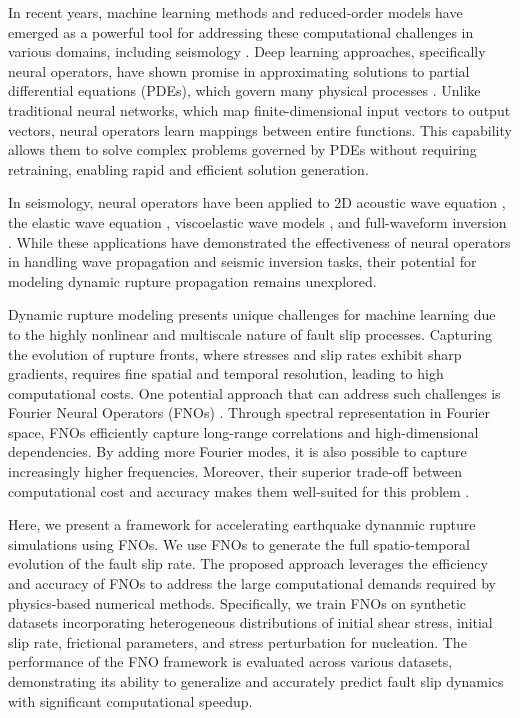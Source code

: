 \documentclass[draft]{agujournal2019}
\begin{document}
In recent years, machine learning methods and reduced-order models have emerged as a powerful tool for addressing these computational challenges in various domains, including seismology \cite{zhu2019seismic, yang2022toward, zhu2019phasenet, mousavi2020earthquake, ross2018p, ross2019phaselink, zhu2022end, rekoske2025reduced}. Deep learning approaches, specifically neural operators, have shown promise in approximating solutions to partial differential equations (PDEs), which govern many physical processes \cite{kovachki2023neural, azizzadenesheli2024neural, rahman2022u}. Unlike traditional neural networks, which map finite-dimensional input vectors to output vectors, neural operators learn mappings between entire functions. This capability allows them to solve complex problems governed by PDEs without requiring retraining, enabling rapid and efficient solution generation. 

In seismology, neural operators have been applied to 2D acoustic wave equation \cite{li2023solving, yang2021seismic}, the elastic wave equation \cite{lehmann2023fourier, lehmann20243d, zou2024deep, zhang2023learning}, viscoelastic wave models \cite{wei2022small}, and full-waveform inversion \cite{yang2023rapid}. While these applications have demonstrated the effectiveness of neural operators in handling wave propagation and seismic inversion tasks, their potential for modeling dynamic rupture propagation remains unexplored.

Dynamic rupture modeling presents unique challenges for machine learning due to the highly nonlinear and multiscale nature of fault slip processes. Capturing the evolution of rupture fronts, where stresses and slip rates exhibit sharp gradients, requires fine spatial and temporal resolution, leading to high computational costs. One potential approach that can address such challenges is Fourier Neural Operators (FNOs) \cite{li2020fourier}. Through spectral representation in Fourier space, FNOs efficiently capture long-range correlations and high-dimensional dependencies. By adding more Fourier modes, it is also possible to capture increasingly higher frequencies. Moreover, their superior trade-off between computational cost and accuracy makes them well-suited for this problem \cite{de2022cost}.

Here, we present a framework for accelerating earthquake dynanmic rupture simulations using FNOs. We use FNOs to generate the full spatio-temporal evolution of the fault slip rate. The proposed approach leverages the efficiency and accuracy of FNOs to address the large computational demands required by physics-based numerical methods. Specifically, we train FNOs on synthetic datasets incorporating heterogeneous distributions of initial shear stress, initial slip rate, frictional parameters, and stress perturbation for nucleation. The performance of the FNO framework is evaluated across various datasets, demonstrating its ability to generalize and accurately predict fault slip dynamics with significant computational speedup.
\end{document}
